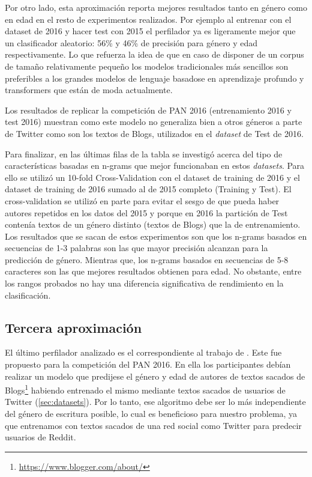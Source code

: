 Por otro lado, esta aproximación reporta mejores resultados tanto en género como en edad en el resto de experimentos realizados. Por ejemplo al entrenar con el dataset de 2016 y hacer test con 2015 el perfilador ya es ligeramente mejor que un clasificador aleatorio: 56\% y 46\% de precisión para género y edad respectivamente. Lo que refuerza la idea de que en caso de disponer de un corpus de tamaño relativamente pequeño los modelos tradicionales más sencillos son preferibles a los grandes modelos de lenguaje basadose en aprendizaje profundo y transformers que están de moda actualmente.

Los resultados de replicar la competición de PAN 2016 (entrenamiento 2016 y test 2016) muestran como este modelo no generaliza bien a otros géneros a parte de Twitter como son los textos de Blogs, utilizados en el \textit{dataset} de Test de 2016.

Para finalizar, en las últimas filas de la tabla se investigó acerca del tipo de características basadas en n-grams que mejor funcionaban en estos \textit{datasets}. Para ello se utilizó un 10-fold Cross-Validation con el dataset de training de 2016 y el dataset de training de 2016 sumado al de 2015 completo (Training y Test). El cross-validation se utilizó en parte para evitar el sesgo de que pueda haber autores repetidos en los datos del 2015 y porque en 2016 la partición de Test contenía textos de un género distinto (textos de Blogs) que la de entrenamiento. Los resultados que se sacan de estos experimentos son que los n-grams basados en secuencias de 1-3 palabras son las que mayor precisión alcanzan para la predicción de género. Mientras que, los n-grams basados en secuencias de  5-8 caracteres son las que mejores resultados obtienen para edad. No obstante, entre los rangos probados no hay una diferencia significativa de rendimiento en la clasificación.
\subsection{Tercera aproximación}
El último perfilador analizado es el correspondiente al trabajo de \cite{modaresi:2016}. Este fue propuesto para la competición del PAN 2016. En ella los participantes debían realizar un modelo que predijese el género y edad de autores de textos sacados de Blogs\footnote{\url{https://www.blogger.com/about/}} habiendo entrenado el mismo mediante textos sacados de usuarios de Twitter (\ref{sec:datasets}). Por lo tanto, ese algoritmo debe ser lo más independiente del género de escritura posible, lo cual es beneficioso para nuestro problema, ya que entrenamos con textos sacados de una red social como Twitter para predecir usuarios de Reddit.

